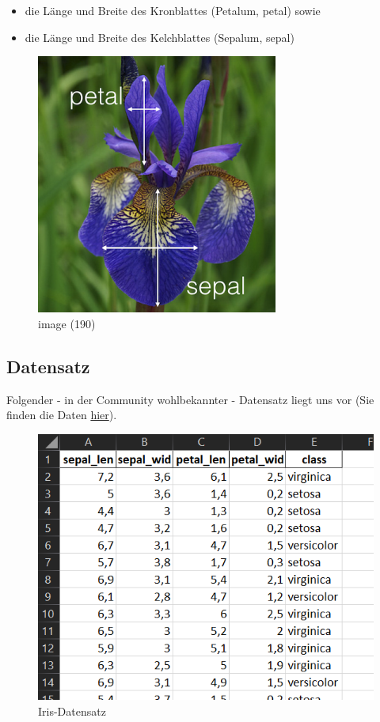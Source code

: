 \documentclass[
  oneside]{book}
\providecommand{\tightlist}{%
  \setlength{\itemsep}{0pt}\setlength{\parskip}{0pt}}
\begin{document}
\begin{itemize}
\tightlist
\item
  die Länge und Breite des Kronblattes (Petalum, petal) sowie 
\item
  die Länge und Breite des Kelchblattes (Sepalum, sepal)
\end{itemize}

\begin{figure}
\centering
\includegraphics{assets/daten.assets/image_messung-16426070933692.png}
\caption{image (190)}
\end{figure}

\hypertarget{datensatz}{%
\subsection{Datensatz}\label{datensatz}}

Folgender - in der Community wohlbekannter - Datensatz liegt uns vor (Sie finden die Daten \href{https://syncandshare.lrz.de/getlink/fi89kxTJ5yLRaW5mnpyrofVK/Iris_p.xlsx}{hier}).

\begin{figure}
\centering
\includegraphics{assets/daten.assets/image-20211209101425856-16426070878651.png}
\caption{Iris-Datensatz}
\end{figure}
\end{document}
